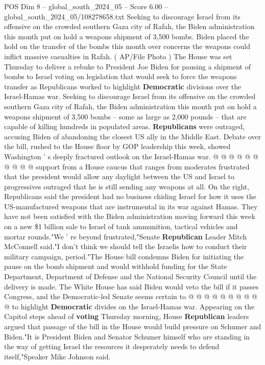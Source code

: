 \begin{textsample}{POS Dim 8 – global\_south\_2024\_05 – Score 6.00 – global\_south\_2024\_05/108278658.txt}  \label{ex:f8_pos_227}
Seeking to discourage Israel from its offensive on the crowded southern Gaza city of Rafah, the Biden administration this month put on hold a weapons shipment of 3,500 bombs.
Biden placed the hold on the transfer of the bombs this month over concerns the weapons could inflict massive casualties in Rafah. ( AP/File Photo ) The House was set Thursday to deliver a rebuke to President Joe Biden for pausing a shipment of bombs to Israel voting on legislation that would seek to force the weapons transfer as Republicans worked to highlight \textbf{Democratic} divisions over the Israel-Hamas war.
Seeking to discourage Israel from its offensive on the crowded southern Gaza city of Rafah, the Biden administration this month put on hold a weapons shipment of 3,500 bombs -- some as large as 2,000 pounds -- that are capable of killing hundreds in populated areas. \textbf{Republicans} were outraged, accusing Biden of abandoning the closest US ally in the Middle East.
Debate over the bill, rushed to the House floor by GOP leadership this week, showed Washington ' s deeply fractured outlook on the Israel-Hamas war. @ @ @ @ @ @ @ @ @ @ support from a House caucus that ranges from moderates frustrated that the president would allow any daylight between the US and Israel to progressives outraged that he is still sending any weapons at all.
On the right, Republicans said the president had no business chiding Israel for how it uses the US-manufactured weapons that are instrumental in its war against Hamas.
They have not been satisfied with the Biden administration moving forward this week on a new \$1 billion sale to Israel of tank ammunition, tactical vehicles and mortar rounds."We ' re beyond frustrated,"Senate \textbf{Republican} Leader Mitch McConnell said."I don't think we should tell the Israelis how to conduct their military campaign, period."The House bill condemns Biden for initiating the pause on the bomb shipment and would withhold funding for the State Department, Department of Defense and the National Security Council until the delivery is made.
The White House has said Biden would veto the bill if it passes Congress, and the Democratic-led Senate seems certain to @ @ @ @ @ @ @ @ @ @ to highlight \textbf{Democratic} divides on the Israel-Hamas war.
Appearing on the Capitol steps ahead of \textbf{voting} Thursday morning, House \textbf{Republican} leaders argued that passage of the bill in the House would build pressure on Schumer and Biden."It is President Biden and Senator Schumer himself who are standing in the way of getting Israel the resources it desperately needs to defend itself,"Speaker Mike Johnson said.

\end{textsample}
